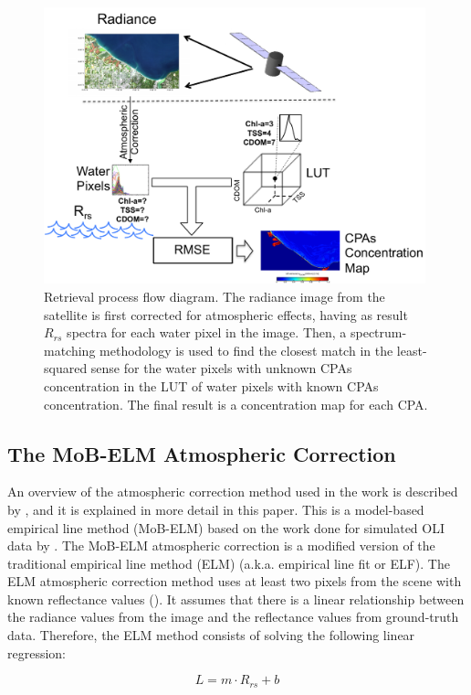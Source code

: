 \documentclass[onecolumn,3p,letterpaper]{elsarticle}
\begin{document}
\begin{figure}[htbp!]
	\centering
    \includegraphics[height=8cm]{./Images/Retrieval_RMSE.pdf}
    \caption{Retrieval process flow diagram. The radiance image from the satellite is first corrected for atmospheric effects, having as result $R_{rs}$ spectra for each water pixel in the image. Then, a spectrum-matching methodology is used to find the closest match in the least-squared sense for the water pixels with unknown CPAs concentration in the LUT of water pixels with known CPAs concentration. The final result is a concentration map for each CPA.  \label{fig:retrieval} }
\end{figure}

\subsection{The MoB-ELM Atmospheric Correction}
An overview of the atmospheric correction method used in the work is described by \cite{Concha2014SPIE}, and it is explained in more detail in this paper. This is a model-based empirical line method (MoB-ELM) based on the work done for simulated OLI data by \cite{Gerace:2012}. The MoB-ELM atmospheric correction is a modified version of the traditional empirical line method (ELM) (a.k.a. empirical line fit or ELF). The ELM atmospheric correction method uses at least two pixels from the scene with known reflectance values (\cite{Schott}). It assumes that there is a linear relationship between the radiance values from the image and the reflectance values from ground-truth data. Therefore, the ELM method consists of solving the following linear regression:

\begin{equation}\label{eq:ELM} 
	L = m\cdot R_{rs} + b
\end{equation}
\end{document}
